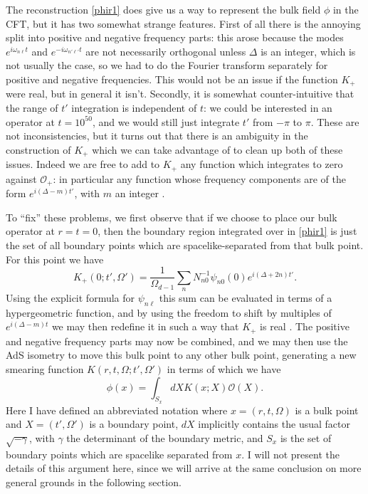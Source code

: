 \documentclass[toc]{PoS}
\newcommand{\be}{\begin{equation}}
\newcommand{\ee}{\end{equation}}
\newcommand{\mO}{\mathcal{O}}
\begin{document}
The reconstruction \eqref{phir1} does give us a way to represent the bulk field $\phi$ in the CFT, but it has two somewhat strange features.  First of all there is the annoying split into positive and negative frequency parts: this arose because the modes $e^{i\omega_{n\ell} t}$ and $e^{-i\omega_{n'\ell'} t}$ are not necessarily orthogonal unless $\Delta$ is an integer, which is not usually the case, so we had to do the Fourier transform separately for positive and negative frequencies.  This would not be an issue if the function $K_+$ were real, but in general it isn't.  Secondly, it is somewhat counter-intuitive that the range of $t'$ integration is independent of $t$: we could be interested in an operator at $t=10^{50}$, and we would still just integrate $t'$ from $-\pi$ to $\pi$.  These are not inconsistencies, but it turns out that there is an ambiguity in the construction of $K_+$ which we can take advantage of to clean up both of these issues.  Indeed we are free to add to $K_+$ any function which integrates to zero against $\mO_+$: in particular any function whose frequency components are of the form $e^{i(\Delta-m)t'}$, with $m$ an integer \cite{Hamilton:2006az}.  


To ``fix'' these problems, we first observe that if we choose to place our bulk operator at $r=t=0$, then the boundary region integrated over in \eqref{phir1} is just the set of all boundary points which are spacelike-separated from that bulk point.  For this point we have
\be
K_+(0;t',\Omega')=\frac{1}{\Omega_{d-1}}\sum_n N_{n0}^{-1}\psi_{n0}(0)e^{i(\Delta+2n)t'}.
\ee
Using the explicit formula for $\psi_{n\ell}$ this sum can be evaluated in terms of a hypergeometric function, and by using the freedom to shift by multiples of $e^{i(\Delta-m)t}$ we may then redefine it in such a way that $K_+$ is real \cite{Hamilton:2006az}.  The positive and negative frequency parts may now be combined, and we may then use the AdS isometry to move this bulk point to any other bulk point, generating a new smearing function $K(r,t,\Omega;t',\Omega')$ in terms of which we have
\be\label{globalR}
\phi(x)=\int_{S_x} dX K(x;X)\mO(X).
\ee
Here I have defined an abbreviated notation where $x=(r,t,\Omega)$ is a bulk point and $X=(t',\Omega')$ is a boundary point, $dX$ implicitly contains the usual  factor $\sqrt{-\gamma}$, with $\gamma$ the determinant of the boundary metric, and $S_x$ is the set of boundary points which are spacelike separated from $x$.  I will not present the details of this argument here, since we will arrive at the same conclusion on more general grounds in the following section.
\end{document}
